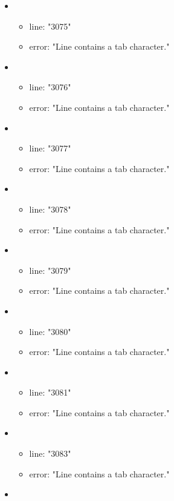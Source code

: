 \begin{itemize}
\begin{itemize}
	\end{itemize}
	\item 
	\begin{itemize} 
		\item line: "3075" 
		\item error: "Line contains a tab character." 
	\end{itemize}
	\item 
	\begin{itemize} 
		\item line: "3076" 
		\item error: "Line contains a tab character." 
	\end{itemize}
	\item 
	\begin{itemize} 
		\item line: "3077" 
		\item error: "Line contains a tab character." 
	\end{itemize}
	\item 
	\begin{itemize} 
		\item line: "3078" 
		\item error: "Line contains a tab character." 
	\end{itemize}
	\item 
	\begin{itemize} 
		\item line: "3079" 
		\item error: "Line contains a tab character." 
	\end{itemize}
	\item 
	\begin{itemize} 
		\item line: "3080" 
		\item error: "Line contains a tab character." 
	\end{itemize}
	\item 
	\begin{itemize} 
		\item line: "3081" 
		\item error: "Line contains a tab character." 
	\end{itemize}
	\item 
	\begin{itemize} 
		\item line: "3083" 
		\item error: "Line contains a tab character." 
	\end{itemize}
	\item 
	\begin{itemize} 

\end{itemize}
\end{itemize}
